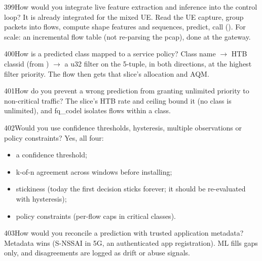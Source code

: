 \begin{qa}{399}{How would you integrate live feature extraction and inference into the control loop?}
It is already integrated for the mixed UE. Read the UE capture, group packets into flows, compute shape features and
sequences, predict, call  (). For scale: an incremental flow table
(not re-parsing the pcap), done at the gateway.
\end{qa}

\begin{qa}{400}{How is a predicted class mapped to a service policy?}
Class name $\rightarrow$ HTB classid (from ) $\rightarrow$ a u32 filter on the 5-tuple, in both
directions, at the highest filter priority. The flow then gets that slice's allocation and AQM.
\end{qa}

\begin{qa}{401}{How do you prevent a wrong prediction from granting unlimited priority to non-critical traffic?}
The slice's HTB rate and ceiling bound it (no class is unlimited), and fq\_codel isolates flows within a class.
\end{qa}

\begin{qa}{402}{Would you use confidence thresholds, hysteresis, multiple observations or policy constraints?}
Yes, all four:
\begin{itemize}
\item a confidence threshold;
\item k-of-n agreement across windows before installing;
\item stickiness (today the first decision sticks forever; it should be re-evaluated with hysteresis);
\item policy constraints (per-flow caps in critical classes).
\end{itemize}
\end{qa}

\begin{qa}{403}{How would you reconcile a prediction with trusted application metadata?}
Metadata wins (S-NSSAI in 5G, an authenticated app registration). ML fills gaps only, and disagreements are logged as
drift or abuse signals.
\end{qa}

